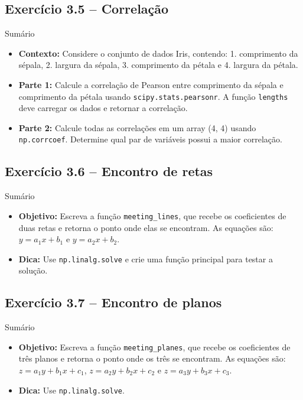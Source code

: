 \documentclass[11pt,a4paper]{article}
\begin{document}
\subsection*{Exercício 3.5 -- Correlação}
\begin{exercicio}{Sumário}
\begin{itemize}
    \item \textbf{Contexto:} Considere o conjunto de dados Iris, contendo: 1. comprimento da sépala, 2. largura da sépala, 3. comprimento da pétala e 4. largura da pétala.
    \item \textbf{Parte 1:} Calcule a correlação de Pearson entre comprimento da sépala e comprimento da pétala usando \texttt{scipy.stats.pearsonr}. A função \texttt{lengths} deve carregar os dados e retornar a correlação.
    \item \textbf{Parte 2:} Calcule todas as correlações em um array (4, 4) usando \texttt{np.corrcoef}. Determine qual par de variáveis possui a maior correlação.
\end{itemize}
\end{exercicio}

\subsection*{Exercício 3.6 -- Encontro de retas}
\begin{exercicio}{Sumário}
\begin{itemize}
    \item \textbf{Objetivo:} Escreva a função \texttt{meeting\_lines}, que recebe os coeficientes de duas retas e retorna o ponto onde elas se encontram. As equações são:
    $y = a_1x + b_1$ e $y = a_2x + b_2$.
    \item \textbf{Dica:} Use \texttt{np.linalg.solve} e crie uma função principal para testar a solução.
\end{itemize}
\end{exercicio}

\subsection*{Exercício 3.7 -- Encontro de planos}
\begin{exercicio}{Sumário}
\begin{itemize}
    \item \textbf{Objetivo:} Escreva a função \texttt{meeting\_planes}, que recebe os coeficientes de três planos e retorna o ponto onde os três se encontram. As equações são:
    $z = a_1y + b_1x + c_1$, $z = a_2y + b_2x + c_2$ e $z = a_3y + b_3x + c_3$.
    \item \textbf{Dica:} Use \texttt{np.linalg.solve}.
\end{itemize}
\end{exercicio}
\end{document}
